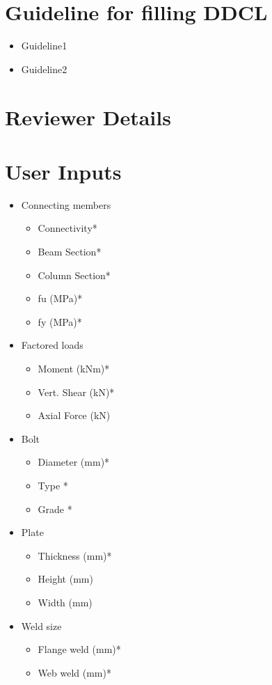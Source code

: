 \documentclass[11.5pt,a4paper,oneside]{report}
\begin{document}
\tableofcontents
\begin{Form}
\chapter*{Guideline for filling DDCL}
	\begin{itemize}
			\item    Guideline1
			\item    Guideline2
	\end{itemize}
\chapter*{Reviewer Details}

\chapter*{User Inputs}


\begin{itemize}
	
	\item Connecting members
	\begin{itemize}
		\item Connectivity*
		\item Beam Section*
		\item Column Section*
		\item fu (MPa)* 
		\item fy (MPa)* 
		
	\end{itemize}

	\item Factored loads
		\begin{itemize}
		\item Moment (kNm)*
		\item Vert. Shear (kN)*
		\item Axial Force (kN)
		\end{itemize}
	\item Bolt
		\begin{itemize}
		\item Diameter (mm)*
		\item Type *
		\item Grade *
		\end{itemize}
	\item Plate
		\begin{itemize}
		\item Thickness (mm)*
		\item Height (mm)
		\item Width (mm)
		\end{itemize}
	\item Weld size
		\begin{itemize}
		\item Flange weld (mm)*
		\item Web weld (mm)*
		\end{itemize}
\end{itemize}

\end{Form}
\end{document}

